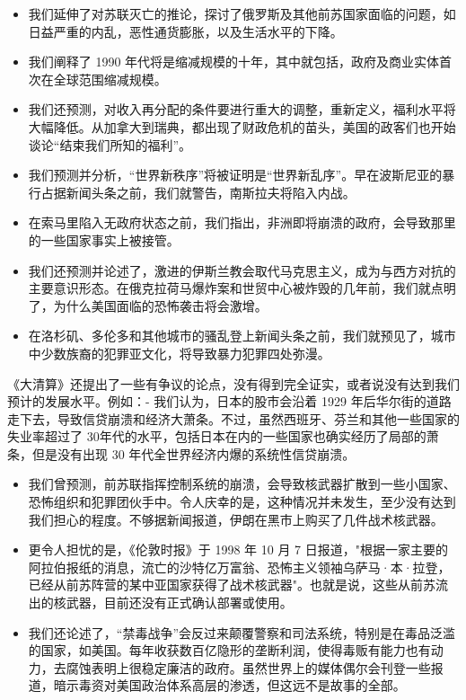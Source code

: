 \begin{itemize}
    \item 我们延伸了对苏联灭亡的推论，探讨了俄罗斯及其他前苏国家面临的问题，如日益严重的内乱，恶性通货膨胀，以及生活水平的下降。
    \item 我们阐释了 1990 年代将是缩减规模的十年，其中就包括，政府及商业实体首次在全球范围缩减规模。
    \item 我们还预测，对收入再分配的条件要进行重大的调整，重新定义，福利水平将大幅降低。从加拿大到瑞典，都出现了财政危机的苗头，美国的政客们也开始谈论“结束我们所知的福利”。
    \item 我们预测并分析，“世界新秩序”将被证明是“世界新乱序”。早在波斯尼亚的暴行占据新闻头条之前，我们就警告，南斯拉夫将陷入内战。
    \item 在索马里陷入无政府状态之前，我们指出，非洲即将崩溃的政府，会导致那里的一些国家事实上被接管。
    \item 我们还预测并论述了，激进的伊斯兰教会取代马克思主义，成为与西方对抗的主要意识形态。在俄克拉荷马爆炸案和世贸中心被炸毁的几年前，我们就点明了，为什么美国面临的恐怖袭击将会激增。
    \item 在洛杉矶、多伦多和其他城市的骚乱登上新闻头条之前，我们就预见了，城市中少数族裔的犯罪亚文化，将导致暴力犯罪四处弥漫。
\end{itemize}

《大清算》还提出了一些有争议的论点，没有得到完全证实，或者说没有达到我们预计的发展水平。例如：- 我们认为，日本的股市会沿着 1929 年后华尔街的道路走下去，导致信贷崩溃和经济大萧条。不过，虽然西班牙、芬兰和其他一些国家的失业率超过了 30年代的水平，包括日本在内的一些国家也确实经历了局部的萧条，但是没有出现 30 年代全世界经济内爆的系统性信贷崩溃。

\begin{itemize}
    \item 我们曾预测，前苏联指挥控制系统的崩溃，会导致核武器扩散到一些小国家、恐怖组织和犯罪团伙手中。令人庆幸的是，这种情况并未发生，至少没有达到我们担心的程度。不够据新闻报道，伊朗在黑市上购买了几件战术核武器。
    \item 更令人担忧的是，《伦敦时报》于 1998 年 10 月 7 日报道，"根据一家主要的阿拉伯报纸的消息，流亡的沙特亿万富翁、恐怖主义领袖乌萨马·本·拉登，已经从前苏阵营的某中亚国家获得了战术核武器"。也就是说，这些从前苏流出的核武器，目前还没有正式确认部署或使用。
    \item 我们还论述了，“禁毒战争”会反过来颠覆警察和司法系统，特别是在毒品泛滥的国家，如美国。每年收获数百亿隐形的垄断利润，使得毒贩有能力也有动力，去腐蚀表明上很稳定廉洁的政府。虽然世界上的媒体偶尔会刊登一些报道，暗示毒资对美国政治体系高层的渗透，但这远不是故事的全部。
\end{itemize}

